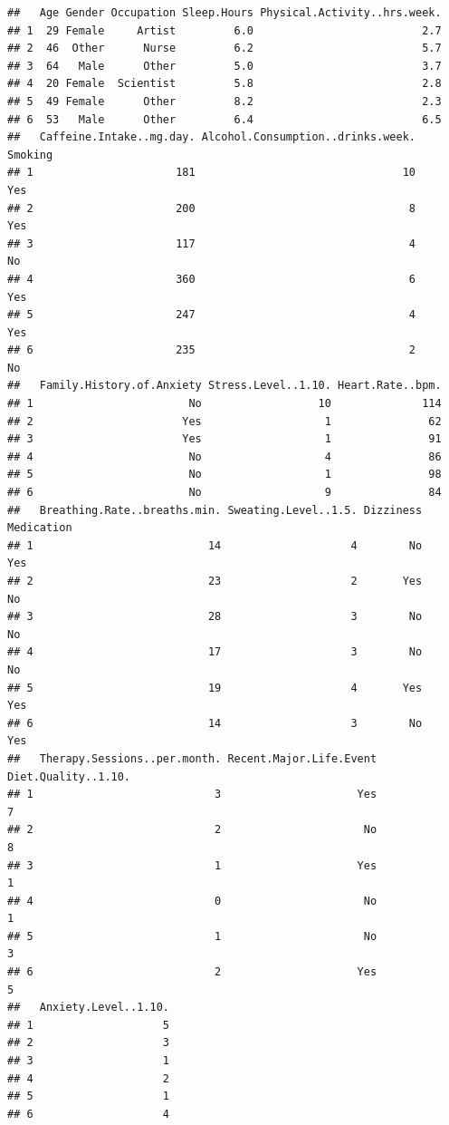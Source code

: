 \documentclass[
]{article}
\begin{document}
\begin{verbatim}
##   Age Gender Occupation Sleep.Hours Physical.Activity..hrs.week.
## 1  29 Female     Artist         6.0                          2.7
## 2  46  Other      Nurse         6.2                          5.7
## 3  64   Male      Other         5.0                          3.7
## 4  20 Female  Scientist         5.8                          2.8
## 5  49 Female      Other         8.2                          2.3
## 6  53   Male      Other         6.4                          6.5
##   Caffeine.Intake..mg.day. Alcohol.Consumption..drinks.week. Smoking
## 1                      181                                10     Yes
## 2                      200                                 8     Yes
## 3                      117                                 4      No
## 4                      360                                 6     Yes
## 5                      247                                 4     Yes
## 6                      235                                 2      No
##   Family.History.of.Anxiety Stress.Level..1.10. Heart.Rate..bpm.
## 1                        No                  10              114
## 2                       Yes                   1               62
## 3                       Yes                   1               91
## 4                        No                   4               86
## 5                        No                   1               98
## 6                        No                   9               84
##   Breathing.Rate..breaths.min. Sweating.Level..1.5. Dizziness Medication
## 1                           14                    4        No        Yes
## 2                           23                    2       Yes         No
## 3                           28                    3        No         No
## 4                           17                    3        No         No
## 5                           19                    4       Yes        Yes
## 6                           14                    3        No        Yes
##   Therapy.Sessions..per.month. Recent.Major.Life.Event Diet.Quality..1.10.
## 1                            3                     Yes                   7
## 2                            2                      No                   8
## 3                            1                     Yes                   1
## 4                            0                      No                   1
## 5                            1                      No                   3
## 6                            2                     Yes                   5
##   Anxiety.Level..1.10.
## 1                    5
## 2                    3
## 3                    1
## 4                    2
## 5                    1
## 6                    4
\end{verbatim}
\end{document}
